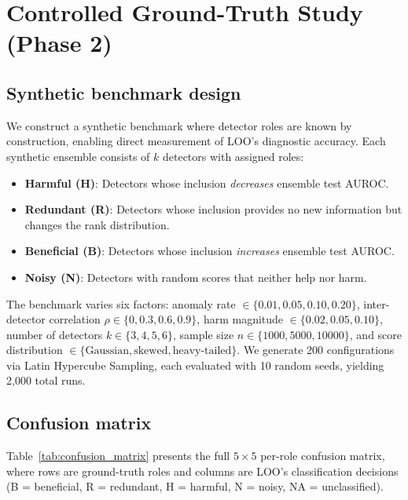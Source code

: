 \section{Controlled Ground-Truth Study (Phase 2)}
\label{sec:phase2}

\subsection{Synthetic benchmark design}

We construct a synthetic benchmark where detector roles are known by construction, enabling direct measurement of LOO's diagnostic accuracy. Each synthetic ensemble consists of $k$ detectors with assigned roles:

\begin{itemize}
\item \textbf{Harmful (H)}: Detectors whose inclusion \emph{decreases} ensemble test AUROC.
\item \textbf{Redundant (R)}: Detectors whose inclusion provides no new information but changes the rank distribution.
\item \textbf{Beneficial (B)}: Detectors whose inclusion \emph{increases} ensemble test AUROC.
\item \textbf{Noisy (N)}: Detectors with random scores that neither help nor harm.
\end{itemize}

The benchmark varies six factors: anomaly rate $\in \{0.01, 0.05, 0.10, 0.20\}$, inter-detector correlation $\rho \in \{0, 0.3, 0.6, 0.9\}$, harm magnitude $\in \{0.02, 0.05, 0.10\}$, number of detectors $k \in \{3, 4, 5, 6\}$, sample size $n \in \{1000, 5000, 10000\}$, and score distribution $\in \{\text{Gaussian}, \text{skewed}, \text{heavy-tailed}\}$. We generate 200 configurations via Latin Hypercube Sampling, each evaluated with 10 random seeds, yielding 2,000 total runs.

\subsection{Confusion matrix}

Table~\ref{tab:confusion_matrix} presents the full $5 \times 5$ per-role confusion matrix, where rows are ground-truth roles and columns are LOO's classification decisions (B = beneficial, R = redundant, H = harmful, N = noisy, NA = unclassified).

